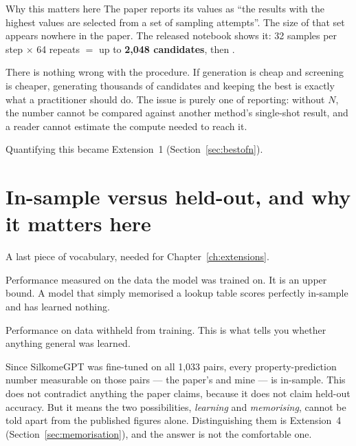 \begin{warnbox}{Why this matters here}
The paper reports its \Rsq{} values as ``the results with the highest \Rsq{}
values are selected from a set of sampling attempts''. The size of that set
appears nowhere in the paper. The released notebook shows it: 32 samples per
step $\times$ 64 repeats $=$ up to \textbf{2{,}048 candidates}, then
.

There is nothing wrong with the procedure. If generation is cheap and screening
is cheaper, generating thousands of candidates and keeping the best is exactly
what a practitioner should do. The issue is purely one of reporting: without
$N$, the number cannot be compared against another method's single-shot result,
and a reader cannot estimate the compute needed to reach it.

Quantifying this became Extension~1 (Section~\ref{sec:bestofn}).
\end{warnbox}

\section{In-sample versus held-out, and why it matters here}

A last piece of vocabulary, needed for Chapter~\ref{ch:extensions}.

\begin{description}[leftmargin=0cm,style=nextline,itemsep=4pt]
\item[In-sample.] Performance measured on the data the model was trained on. It
  is an upper bound. A model that simply memorised a lookup table scores
  perfectly in-sample and has learned nothing.

\item[Held-out (out-of-sample).] Performance on data withheld from training.
  This is what tells you whether anything general was learned.
\end{description}

Since SilkomeGPT was fine-tuned on all 1{,}033 pairs, every property-prediction
number measurable on those pairs --- the paper's and mine --- is in-sample. This
does not contradict anything the paper claims, because it does not claim
held-out accuracy. But it means the two possibilities, \emph{learning} and
\emph{memorising}, cannot be told apart from the published figures alone.
Distinguishing them is Extension~4 (Section~\ref{sec:memorisation}), and the
answer is not the comfortable one.
